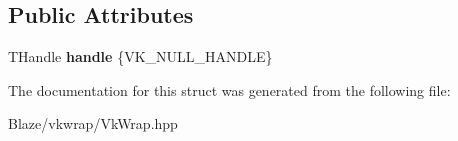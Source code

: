 \subsection*{Public Attributes}
\begin{DoxyCompactItemize}
\item 
\mbox{\label{structblaze_1_1vkw_1_1BaseWrapper_a3ec3941b2d349524f0d1f8491f5247ff}} 
T\+Handle {\bfseries handle} \{V\+K\+\_\+\+N\+U\+L\+L\+\_\+\+H\+A\+N\+D\+LE\}
\end{DoxyCompactItemize}


The documentation for this struct was generated from the following file\+:\begin{DoxyCompactItemize}
\item 
Blaze/vkwrap/Vk\+Wrap.\+hpp\end{DoxyCompactItemize}
